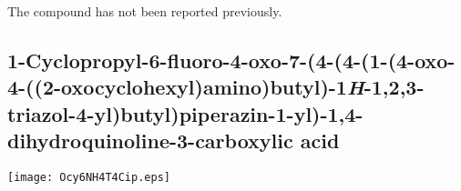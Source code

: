 \\[1\baselineskip]
\\[1\baselineskip]
\\[1\baselineskip]
The compound has not been reported previously.

\subsection{1\hyp{}Cyclopropyl\hyp{}6\hyp{}fluoro\hyp{}4\hyp{}oxo\hyp{}7\hyp{}(4\hyp{}(4\hyp{}(1\hyp{}(4\hyp{}oxo\hyp{}4\hyp{}((2\hyp{}oxocyclohexyl)amino)bu\allowbreak t\allowbreak yl)\hyp{}1\textit{H}\hyp{}1,2,3\hyp{}triazol\hyp{}4\hyp{}yl)butyl)piperazin\hyp{}1\hyp{}yl)\hyp{}1,4\hyp{}dihydroquinoline\hyp{}3\hyp{}carb\allowbreak o\allowbreak x\allowbreak ylic acid }


\begin{scheme}[H]
	\begin{center}
		\texttt{[image: Ocy6NH4T4Cip.eps]}
	\end{center}
\end{scheme}

